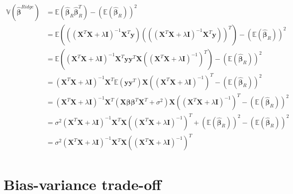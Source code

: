 \begin{align*}
    \mathbb{V}(\boldsymbol{\hat{\beta}}^{Ridge}) &= \mathbb{E} (\boldsymbol{\hat{\beta}}_{R} \boldsymbol{\hat{\beta}}_{R}^{T}) - (\mathbb{E} (\boldsymbol{\hat{\beta}}_{R}))^{2} \\
    &= \mathbb{E} (((\boldsymbol{X}^{T}\boldsymbol{X} + \lambda \boldsymbol{I})^{-1} \boldsymbol{X}^{T} \boldsymbol{y}) (((\boldsymbol{X}^{T}\boldsymbol{X} + \lambda \boldsymbol{I})^{-1} \boldsymbol{X}^{T} \boldsymbol{y}))^{T}) - (\mathbb{E} (\boldsymbol{\hat{\beta}}_{R}))^{2} \\
    &= \mathbb{E} ((\boldsymbol{X}^{T}\boldsymbol{X} + \lambda \boldsymbol{I})^{-1} \boldsymbol{X}^{T} \boldsymbol{y} \boldsymbol{y}^{T} \boldsymbol{X} ((\boldsymbol{X}^{T}\boldsymbol{X} + \lambda \boldsymbol{I})^{-1})^{T} ) - (\mathbb{E} (\boldsymbol{\hat{\beta}}_{R}))^{2} \\
    &= (\boldsymbol{X}^{T}\boldsymbol{X} + \lambda \boldsymbol{I})^{-1} \boldsymbol{X}^{T} \mathbb{E} (\boldsymbol{y} \boldsymbol{y}^{T} ) \boldsymbol{X} ((\boldsymbol{X}^{T}\boldsymbol{X} + \lambda \boldsymbol{I})^{-1})^{T} - (\mathbb{E} (\boldsymbol{\hat{\beta}}_{R}))^{2} \\
    &= (\boldsymbol{X}^{T}\boldsymbol{X} + \lambda \boldsymbol{I})^{-1} \boldsymbol{X}^{T} (\boldsymbol{X} \boldsymbol{\beta} \boldsymbol{\beta}^{T} \boldsymbol{X}^{T} + \sigma^{2}) \boldsymbol{X} ((\boldsymbol{X}^{T}\boldsymbol{X} + \lambda \boldsymbol{I})^{-1})^{T} - (\mathbb{E} (\boldsymbol{\hat{\beta}}_{R}))^{2} \\
    &= \sigma^{2}(\boldsymbol{X}^{T}\boldsymbol{X} + \lambda \boldsymbol{I})^{-1} \boldsymbol{X}^{T} \boldsymbol{X} ((\boldsymbol{X}^{T}\boldsymbol{X} + \lambda \boldsymbol{I})^{-1})^{T} + (\mathbb{E} (\boldsymbol{\hat{\beta}}_{R}))^{2} - (\mathbb{E} (\boldsymbol{\hat{\beta}}_{R}))^{2} \\
    &= \sigma^{2}(\boldsymbol{X}^{T}\boldsymbol{X} + \lambda \boldsymbol{I})^{-1} \boldsymbol{X}^{T} \boldsymbol{X} ((\boldsymbol{X}^{T}\boldsymbol{X} + \lambda \boldsymbol{I})^{-1})^{T} \\
\end{align*}


\section{Bias-variance trade-off}

